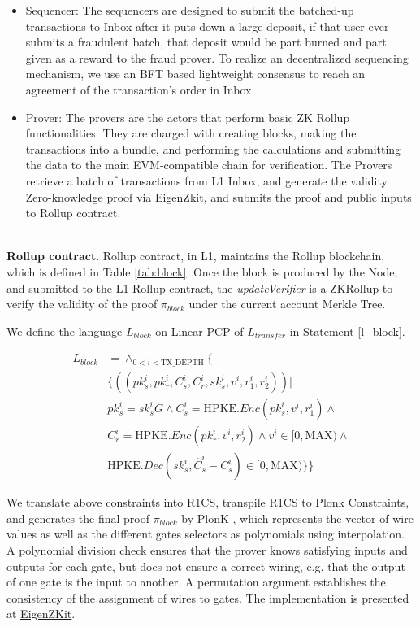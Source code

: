 \documentclass{article}
\begin{document}
\begin{itemize}
    \item Sequencer: The sequencers are designed to submit the batched-up transactions to Inbox after it puts down a large deposit, if that user ever submits a fraudulent batch, that deposit would be part burned and part given as a reward to the fraud prover. To realize an decentralized sequencing mechanism, we use an BFT based lightweight consensus to reach an agreement of the transaction's order in Inbox.
    \item Prover:  The provers are the actors that perform basic ZK Rollup functionalities. They are charged with creating blocks, making the transactions into a bundle, and performing the calculations and submitting the data to the main EVM-compatible chain for verification. The Provers retrieve a batch of transactions from L1 Inbox, and generate the validity Zero-knowledge proof via EigenZkit, and submits the proof and public inputs to Rollup contract.
\end{itemize}

~\\
\noindent\textbf{Rollup contract}. Rollup contract, in L1,  maintains the Rollup blockchain, which is defined in Table \ref{tab:block}. Once the block is produced by the Node, and submitted to the L1 Rollup contract, the \textit{updateVerifier} is a ZKRollup to verify the validity of the proof $\pi_{block}$ under the current account Merkle Tree. 

We define the language $L_{block}$ on Linear PCP of $L_{transfer}$ in Statement \ref{l_block}.

\begin{equation}
\begin{aligned} \label{l_block}
    L_{block} &= \wedge_{0 < i < \mbox{TX\_DEPTH}} \{  \\
        &\{((pk_s^i, pk_r^i, C_s^i, C_r^i, sk_s^i, v^i, r_1^i, r_2^i)) | \\ 
        &pk_s^i = sk_s^iG \land C_s^i = \mbox{HPKE}.Enc(pk_s^i,v^i, r_1^i) \land \\
        &C_r^i =  \mbox{HPKE}.Enc(pk_r^i,v^i, r_2^i) \land v^i \in [0, \mbox{MAX}) \land \\
        &\mbox{HPKE}.Dec(sk_s^i, \hat{C}_s^i - C_s^i) \in [0, \mbox{MAX})\}\}
\end{aligned}
\end{equation}

We translate above constraints into R1CS, transpile R1CS to Plonk Constraints, and generates the final proof $\pi_{block}$ by PlonK \cite{gabizon2019plonk}, which represents the vector of wire values as well as the different gates selectors as polynomials using interpolation. A polynomial division check ensures that the prover knows satisfying inputs and outputs for each gate, but does not ensure a correct wiring, e.g. that the output of one gate is the input to another. A permutation argument establishes the consistency of the assignment of wires to gates. The implementation is presented at \href{https://github.com/ieigen/EigenZKit}{EigenZKit}.
\end{document}

